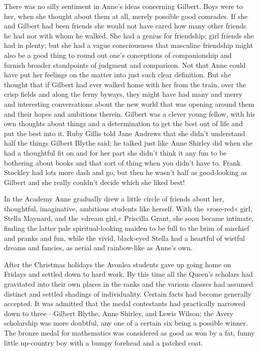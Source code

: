 There was no silly sentiment in Anne’s ideas concerning Gilbert. Boys were to her, when she thought about them at all, merely possible good comrades. If she and Gilbert had been friends she would not have cared how many other friends he had nor with whom he walked. She had a genius for friendship; girl friends she had in plenty; but she had a vague consciousness that masculine friendship might also be a good thing to round out one’s conceptions of companionship and furnish broader standpoints of judgment and comparison. Not that Anne could have put her feelings on the matter into just such clear definition. But she thought that if Gilbert had ever walked home with her from the train, over the crisp fields and along the ferny byways, they might have had many and merry and interesting conversations about the new world that was opening around them and their hopes and ambitions therein. Gilbert was a clever young fellow, with his own thoughts about things and a determination to get the best out of life and put the best into it. Ruby Gillis told Jane Andrews that she didn’t understand half the things Gilbert Blythe said; he talked just like Anne Shirley did when she had a thoughtful fit on and for her part she didn’t think it any fun to be bothering about books and that sort of thing when you didn’t have to. Frank Stockley had lots more dash and go, but then he wasn’t half as good-looking as Gilbert and she really couldn’t decide which she liked best!

In the Academy Anne gradually drew a little circle of friends about her, thoughtful, imaginative, ambitious students like herself. With the »rose-red« girl, Stella Maynard, and the »dream girl,« Priscilla Grant, she soon became intimate, finding the latter pale spiritual-looking maiden to be full to the brim of mischief and pranks and fun, while the vivid, black-eyed Stella had a heartful of wistful dreams and fancies, as aerial and rainbow-like as Anne’s own.

After the Christmas holidays the Avonlea students gave up going home on Fridays and settled down to hard work. By this time all the Queen’s scholars had gravitated into their own places in the ranks and the various classes had assumed distinct and settled shadings of individuality. Certain facts had become generally accepted. It was admitted that the medal contestants had practically narrowed down to three—Gilbert Blythe, Anne Shirley, and Lewis Wilson; the Avery scholarship was more doubtful, any one of a certain six being a possible winner. The bronze medal for mathematics was considered as good as won by a fat, funny little up-country boy with a bumpy forehead and a patched coat.

